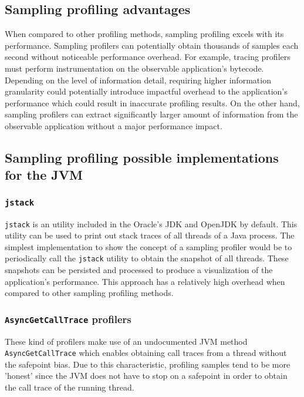 \documentclass[..thesis.tex]{subfiles}
\begin{document}
\subsection{Sampling profiling advantages}
When compared to other profiling methods, sampling profiling excels with its performance. Sampling profilers can potentially obtain thousands of samples each second without noticeable performance overhead. For example, tracing profilers must perform instrumentation on the observable application's bytecode. Depending on the level of information detail, requiring higher information granularity
could potentially introduce impactful overhead to the application's performance which could result in inaccurate profiling results. On the other hand, sampling profilers can extract significantly larger amount of information from the observable application without a major performance impact.


\subsection{Sampling profiling possible implementations for the JVM}

\subsubsection{\texttt{jstack}}
\texttt{jstack} is an utility included in the Oracle's JDK and OpenJDK by default. This utility can be used to print out stack traces of all threads of a Java process.\cite{jstack} The simplest implementation to show the concept of a sampling profiler would be to periodically call the \texttt{jstack} utility to obtain the snapshot of all threads. These snapshots can be persisted and processed to produce a visualization of the application's performance. This approach has a relatively high overhead when compared to other sampling profiling methods.

\subsubsection{\texttt{AsyncGetCallTrace} profilers}
These kind of profilers make use of an undocumented JVM method \texttt{Async\-Get\-Call\-Trace} \cite{agct_source} which enables obtaining call traces from a thread without the safepoint bias. Due to this characteristic, profiling samples tend to be more 'honest' since the JVM does not have to stop on a safepoint in order to obtain the call trace of the running thread.
\end{document}
